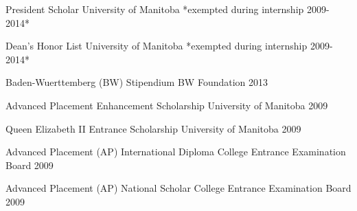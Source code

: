 \begin{cvhonors}


  \cvhonor
	{President Scholar} %
	{University of Manitoba} %
	{*exempted during internship} %
	{2009-2014*} %
	
  \cvhonor
	{Dean's Honor List} %
	{University of Manitoba} %
	{*exempted during internship} %
	{2009-2014*} %
	
  \cvhonor
	{Baden-Wuerttemberg (BW) Stipendium} %
	{BW Foundation} %
	{} %
	{2013} %
	
  \cvhonor
	{Advanced Placement Enhancement Scholarship} %
	{University of Manitoba} %
	{} %
	{2009} %
	
  \cvhonor
	{Queen Elizabeth II Entrance Scholarship} %
	{University of Manitoba} %
	{} %
	{2009} %
	
  \cvhonor
	{Advanced Placement (AP) International Diploma} %
	{College Entrance Examination Board} %
	{} %
	{2009} %
	
  \cvhonor
	{Advanced Placement (AP) National Scholar} %
	{College Entrance Examination Board} %
	{} %
	{2009} %

\end{cvhonors}
